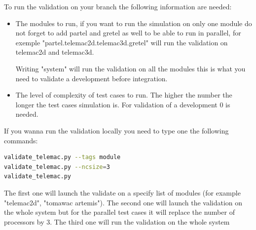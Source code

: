 %
To run the validation on your branch the following information are needed:
\begin{itemize}
\item The modules to run, if you want to run the simulation on only one module
do not forget to add partel and gretel as well to be able to run in parallel,
for exemple "partel.telemac2d.telemac3d.gretel" will run the validation on
telemac2d and telemac3d.

Writing "system" will run the validation on all the modules this is what you
need to validate a development before integration.
\item The level of complexity of test cases to run. The higher the number the
longer the test cases simulation is. For validation of a development 0 is
needed.
\end{itemize}

If you wanna run the validation locally you need to type one the following commands:
\begin{lstlisting}[language=bash]
validate_telemac.py --tags module
validate_telemac.py --ncsize=3
validate_telemac.py
\end{lstlisting}
The first one will launch the validate on a specify list of modules (for example
"telemac2d", "tomawac artemis").
The second one will launch the validation on the whole system but for the
parallel test cases it will replace the number of processors by 3.
The third one will run the validation on the whole system
%
%
